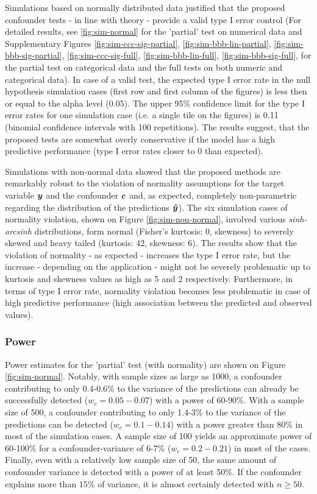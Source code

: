 \documentclass{article}
\begin{document}
Simulations based on normally distributed data justified that the proposed confounder tests - in line with theory - provide a valid type I error control (For detailed results, see \ref{fig:sim-normal} for the 'partial' test on numerical data and Supplementary Figures \ref{fig:sim-ccc-sig-partial}, \ref{fig:sim-bbb-lin-partial}, \ref{fig:sim-bbb-sig-partial}, \ref{fig:sim-ccc-sig-full}, \ref{fig:sim-bbb-lin-full}, \ref{fig:sim-bbb-sig-full}, for the partial test on categorical data and the full tests on both numeric and categorical data). 
In case of a valid test, the expected type I error rate in the null hypothesis simulation cases (first row and first column of the figures) is less then or equal to the alpha level (0.05). The upper 95\% confidence limit for the type I error rates for one simulation case (i.e. a single tile on the figures) is 0.11 (binomial confidence intervals with 100 repetitions). 
The results suggest, that the proposed tests are somewhat overly conservative if the model has a high predictive performance (type I error rates closer to 0 than expected).

Simulations with non-normal data showed that the proposed methods are remarkably robust to the violation of normality assumptions for the target variable $\boldsymbol{y}$ and the confounder $\boldsymbol{c}$ and, as expected, completely non-parametric regarding the distribution of the predictions $\boldsymbol{\hat{y}}$). The six simulation cases of normality violation, shown on Figure \ref{fig:sim-non-normal}, involved various \emph{sinh-arcsinh} distributions, form normal (Fisher's kurtosis: 0, skewness) to severely skewed and heavy tailed (kurtosis: 42, skewness: 6).
The results show that the violation of normality - as expected - increases the type I error rate, but the increase - depending on the application - might not be severely problematic up to kurtosis and skewness values as high as 5 and 2 respectively. Furthermore, in terms of type I error rate, normality violation becomes less problematic in case of high predictive performance (high association between the predicted and observed values).

\subsubsection*{Power}

Power estimates for the 'partial' test (with normality) are shown on Figure \ref{fig:sim-normal}. Notably, with sample sizes as large as 1000, a confounder contributing to only 0.4-0.6\% to the variance of the predictions can already be successfully detected ($w_c = 0.05 - 0.07$) with a power of 60-90\%. With a sample size of 500, a confounder contributing to only 1.4-3\% to the variance of the predictions can be detected ($w_c = 0.1 - 0.14$) with a power greater than 80\% in most of the simulation cases. A sample size of 100 yields an approximate power of 60-100\% for a confounder-variance of 6-7\% ($w_c = 0.2 - 0.21$) in most of the cases. Finally, even with a relatively low sample size of 50, the same amount of confounder variance is detected with a power of at least 50\%. If the confounder explains more than 15\% of variance, it is almost certainly detected with $n \geq 50$.
\end{document}
